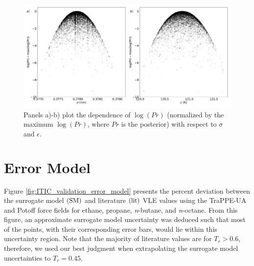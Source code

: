 \documentclass[journal=jctc,manuscript=article]{achemso}
\begin{document}
\begin{figure}[hbt!]
	\centering
	\includegraphics[width=6.4in]{MCMC_supporting_information_2}
	\caption{Panels a)-b) plot the dependence of $\log(Pr)$ (normalized by the maximum $\log(Pr)$, where $Pr$ is the posterior) with respect to $\sigma$ and $\epsilon$.}
	\label{fig:MCMC_supporting_information_2}
\end{figure} 

\newpage

\section{Error Model} \label{Error Model}

Figure \ref{fig:ITIC_validation_error_model} presents the percent deviation between the surrogate model $(\rm SM)$ and literature $(\rm lit)$ VLE values using the TraPPE-UA and Potoff force fields for ethane, propane, \textit{n}-butane, and \textit{n}-octane. From this figure, an approximate surrogate model uncertainty was deduced such that most of the points, with their corresponding error bars, would lie within this uncertainty region. Note that the majority of literature values are for $T_r > 0.6$, therefore, we used our best judgment when extrapolating the surrogate model uncertainties to $T_r = 0.45$. 
\end{document}
